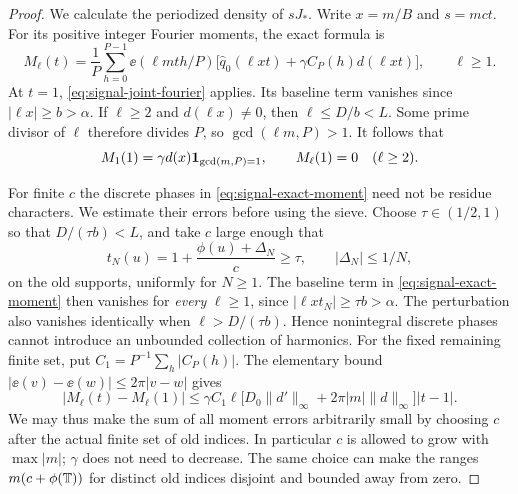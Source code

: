 \begin{proof}
We calculate the periodized density of $sJ_*$.  Write $x=m/B$ and
$s=mct$.  For its positive integer Fourier moments, the exact formula is
\begin{equation}
 M_\ell(t)=\frac1P\sum_{h=0}^{P-1}\ee(\ell mt h/P)
 \bigl[\widehat q_0(\ell xt)
             +\gamma C_P(h)d(\ell xt)\bigr],\qquad \ell\ge1.
 \label{eq:signal-exact-moment}
\end{equation}
At $t=1$, \eqref{eq:signal-joint-fourier} applies.  Its baseline term
vanishes since $|\ell x|\ge b>\alpha$.  If $\ell\ge2$ and
$d(\ell x)\ne0$, then $\ell\le D/b<L$.  Some prime divisor of $\ell$
therefore divides $P$, so $\gcd(\ell m,P)>1$.  It follows that
\begin{equation}
 M_1(1)=\gamma d(x)\mathbf 1_{\gcd(m,P)=1},
 \qquad M_\ell(1)=0\quad(\ell\ge2).
 \label{eq:signal-ideal-moments}
\end{equation}

For finite $c$ the discrete phases in
\eqref{eq:signal-exact-moment} need not be residue characters.  We
estimate their errors before using the sieve.  Choose
$\tau\in(1/2,1)$ so that $D/(\tau b)<L$, and take $c$ large enough
that
\[
 t_N(u)=1+\frac{\phi(u)+\Delta_N}{c}\ge\tau,
 \qquad |\Delta_N|\le1/N,
\]
on the old supports, uniformly for $N\ge1$.  The baseline term in
\eqref{eq:signal-exact-moment} then vanishes for \emph{every}
$\ell\ge1$, since $|\ell xt_N|\ge\tau b>\alpha$.
The perturbation also vanishes identically when
$\ell>D/(\tau b)$.  Hence nonintegral discrete phases cannot introduce
an unbounded collection of harmonics.  For the fixed remaining finite
set, put $C_1=P^{-1}\sum_h|C_P(h)|$.  The elementary bound
$|\ee(v)-\ee(w)|\le2\pi|v-w|$ gives
\begin{equation}
 |M_\ell(t)-M_\ell(1)|
 \le\gamma C_1\ell
 \bigl[D_0\|d'\|_\infty+2\pi|m|\|d\|_\infty\bigr]|t-1|.
 \label{eq:signal-finite-c}
\end{equation}
We may thus make the sum of all moment errors arbitrarily small by
choosing $c$ after the actual finite set of old indices.  In particular
$c$ is allowed to grow with $\max|m|$; $\gamma$ does not need to decrease.
The same choice can make the ranges $m(c+\phi(\mathbb T))$ for distinct old
indices disjoint and bounded away from zero.


\end{proof}
